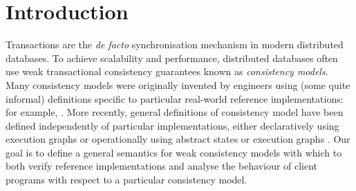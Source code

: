 \section{Introduction}
\label{sec:intro}

Transactions are the \emph{de facto} synchronisation mechanism in
modern distributed databases. To achieve scalability and performance,
distributed databases often use weak transactional consistency
guarantees known as \emph{consistency models}.  Many consistency
models were originally invented by engineers using (some quite
informal) definitions specific to particular real-world reference
implementations: for example,
\cite{ramp,si,distrsi,clocksi,cops,PSI-RA,NMSI,PSI}.
More recently, general definitions of consistency model have been
defined independently of particular implementations, either
declaratively using execution graphs \cite{adya,ev_transactions} or
operationally using abstract 
states or execution graphs
\cite{seebelieve,alonetogether,sureshConcur}. 
Our goal  is to define a general semantics for weak consistency
models  with which to both 
verify  reference  implementations {and} analyse 
the behaviour of client programs with respect to a particular consistency
model. 






